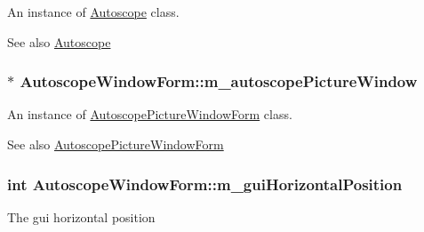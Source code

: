 An instance of \hyperlink{class_autoscope}{Autoscope} class. 

\begin{DoxySeeAlso}{See also}
\hyperlink{class_autoscope}{Autoscope} 
\end{DoxySeeAlso}
\subsubsection[{\texorpdfstring{m\+\_\+autoscope\+Picture\+Window}{m_autoscopePictureWindow}}]{$\ast$ Autoscope\+Window\+Form\+::m\+\_\+autoscope\+Picture\+Window\hspace{0.3cm}{\ttfamily [private]}}\hypertarget{class_autoscope_window_form_a859556308e579b3c83862e943684f859}{}\label{class_autoscope_window_form_a859556308e579b3c83862e943684f859}


An instance of \hyperlink{class_autoscope_picture_window_form}{Autoscope\+Picture\+Window\+Form} class. 

\begin{DoxySeeAlso}{See also}
\hyperlink{class_autoscope_picture_window_form}{Autoscope\+Picture\+Window\+Form} 
\end{DoxySeeAlso}
\subsubsection[{\texorpdfstring{m\+\_\+gui\+Horizontal\+Position}{m_guiHorizontalPosition}}]{\setlength{\rightskip}{0pt plus 5cm}int Autoscope\+Window\+Form\+::m\+\_\+gui\+Horizontal\+Position\hspace{0.3cm}{\ttfamily [private]}}\hypertarget{class_autoscope_window_form_a729b0f3174ac22f142a78dbc6d2677be}{}\label{class_autoscope_window_form_a729b0f3174ac22f142a78dbc6d2677be}
The gui horizontal position 
